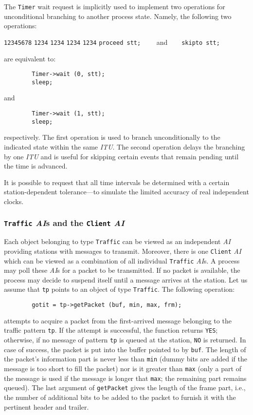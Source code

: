 The {\tt Timer} wait request is implicitly used to implement two operations
for unconditional branching to another process state.
Namely, the following two operations:
{\small
\begin{tabbing}
{\tt 12345678} \= {\tt 1234} \= {\tt 1234} \= {\tt 1234} \= {\tt 1234} \kill
\> {\tt proceed stt;} $\;\;\;\;\;\;$ and $\;\;\;\;\;$ {\tt skipto stt;}
\end{tabbing} }
\noindent
are equivalent to:
{\small
\begin{verbatim}
        Timer->wait (0, stt);
        sleep;
\end{verbatim} }
\noindent
and
{\small
\begin{verbatim}
        Timer->wait (1, stt);
        sleep;
\end{verbatim} }
\noindent
respectively.
The first operation is used to branch unconditionally to the indicated state
within the same {\em ITU}.
The second operation delays the branching by one {\em ITU} and is useful
for skipping certain events that remain pending until the time is advanced.

It is possible to request that all time intervals be determined with a
certain station-dependent tolerance---to simulate the limited accuracy of
real independent clocks.

\subsubsection{{\tt Traffic} {\em AI\/}s and the {\tt Client} {\em AI}}

Each object belonging to type {\tt Traffic} can be viewed as an independent
{\em AI\/} providing stations with messages to transmit.
Moreover, there is one {\tt Client}
{\em AI} which can be viewed as a combination
of all individual {\tt Traffic} {\em AI\/}s.
A process may poll these {\em AI\/}s for a packet to be transmitted.
If no packet is available, the process may decide to suspend itself until
a message arrives at the station.
Let us assume that {\tt tp} points to an object of type {\tt Traffic}.
The following operation:
{\small
\begin{verbatim}
        gotit = tp->getPacket (buf, min, max, frm);
\end{verbatim} }
\noindent
attempts to acquire a packet from the first-arrived
message belonging to the traffic pattern {\tt tp}.
If the attempt is successful, the function returns {\tt YES}; otherwise,
if no message of pattern {\tt tp} is queued at the station, {\tt NO} is
returned.
In case of success, the packet is put into the buffer pointed to by
{\tt buf}.
The length of the packet's information part is never less than {\tt min}
(dummy bits are added if the message is too short to fill the
packet) nor is it greater than {\tt max} (only a part of the message is used
if the message is longer that {\tt max}; the remaining part remains queued).
The last argument of {\tt getPacket} gives the length of the frame part, i.e.,
the number of additional bits to be added to the packet to furnish it with
the pertinent header and trailer.

